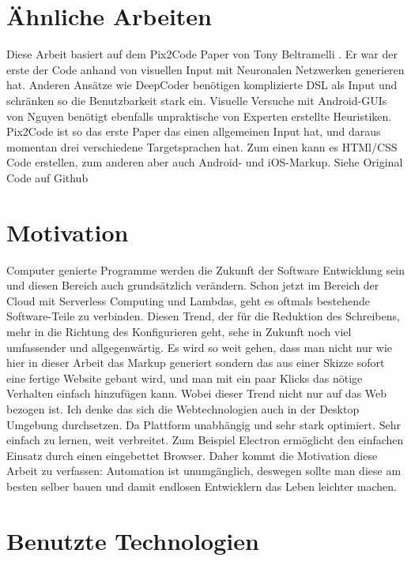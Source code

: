 \documentclass[pdftex,a4paper,halfparskip, article]{scrartcl}
\begin{document}
\section{Ähnliche Arbeiten}

Diese Arbeit basiert auf dem Pix2Code Paper von Tony Beltramelli \cite{Beltramelli17}. Er war der erste der Code anhand von visuellen Input mit Neuronalen Netzwerken generieren hat. 
Anderen Ansätze wie DeepCoder \cite{DeepCoder16} benötigen komplizierte DSL als Input und schränken so die Benutzbarkeit stark ein. Visuelle Versuche mit Android-GUIs von Nguyen \cite{Nguyen15} benötigt ebenfalls unpraktische von Experten erstellte Heuristiken. Pix2Code ist so das erste Paper das einen allgemeinen Input hat, und daraus momentan drei verschiedene Targetsprachen hat. Zum einen kann es HTMl/CSS Code erstellen, zum anderen aber auch Android- und iOS-Markup. Siehe Original Code auf Github \cite{Beltramelli17Github}


\section{Motivation}

Computer genierte Programme werden die Zukunft der Software Entwicklung sein und diesen Bereich auch grundsätzlich verändern. Schon jetzt im Bereich der Cloud mit Serverless Computing und Lambdas, geht es oftmals bestehende Software-Teile zu verbinden. Diesen Trend, der für die Reduktion des Schreibens, mehr in die Richtung des Konfigurieren geht, sehe in Zukunft noch viel umfassender und allgegenwärtig. Es wird so weit gehen, dass man nicht nur wie hier in dieser Arbeit das Markup generiert sondern das aus einer Skizze sofort eine fertige Website gebaut wird, und man mit ein paar Klicks das nötige Verhalten einfach hinzufügen kann. 
Wobei dieser Trend nicht nur auf das Web bezogen ist. Ich denke das sich die Webtechnologien auch in der Desktop Umgebung durchsetzen.  Da Plattform unabhängig und sehr stark optimiert. Sehr einfach zu lernen, weit verbreitet. Zum Beispiel Electron \cite{electron} ermöglicht den einfachen Einsatz durch einen eingebettet Browser.
Daher kommt die Motivation diese Arbeit zu verfassen: Automation ist unumgänglich, deswegen sollte man diese am besten selber bauen und damit endlosen Entwicklern das Leben leichter machen.

\section{Benutzte Technologien}
\end{document}
